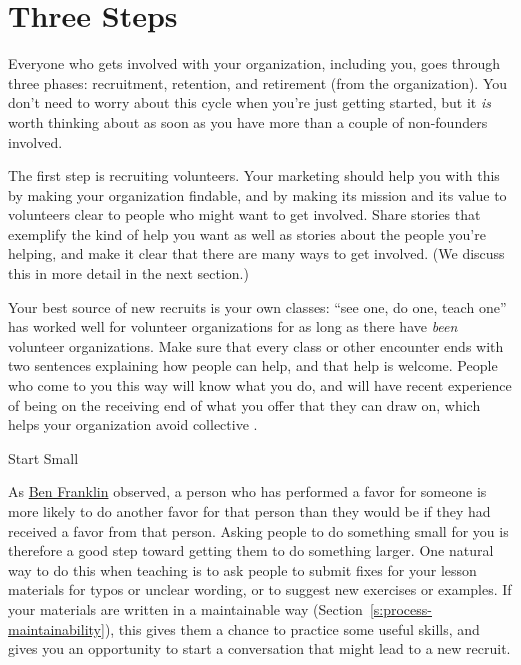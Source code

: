 \section{Three Steps}\label{s:community-three-steps}

Everyone who gets involved with your organization, including you, goes
through three phases: recruitment, retention, and retirement (from the
organization). You don't need to worry about this cycle when you're just
getting started, but it \emph{is} worth thinking about as soon as you have
more than a couple of non-founders involved.

The first step is recruiting volunteers. Your marketing should help you
with this by making your organization findable, and by making its
mission and its value to volunteers clear to people who might want to
get involved. Share stories that exemplify the kind of help you want as
well as stories about the people you're helping, and make it clear that
there are many ways to get involved. (We discuss this in more detail in
the next section.)

Your best source of new recruits is your own classes: ``see one, do one,
teach one'' has worked well for volunteer organizations for as long as
there have \emph{been} volunteer organizations. Make sure that every class or
other encounter ends with two sentences explaining how people can help,
and that help is welcome. People who come to you this way will know what
you do, and will have recent experience of being on the receiving end of
what you offer that they can draw on, which helps your organization
avoid collective .

\begin{aside}{Start Small}

As \href{https://en.wikipedia.org/wiki/Ben\_Franklin\_effect}{Ben Franklin} observed, a person who has
performed a favor for someone is more likely to do another favor for
that person than they would be if they had received a favor from
that person. Asking people to do something small for you is
therefore a good step toward getting them to do something
larger. One natural way to do this when teaching is to ask people to
submit fixes for your lesson materials for typos or unclear wording,
or to suggest new exercises or examples. If your materials are
written in a maintainable way
(Section~\ref{s:process-maintainability}), this gives them a chance to
practice some useful skills, and gives you an opportunity to start a
conversation that might lead to a new recruit.

\end{aside}

